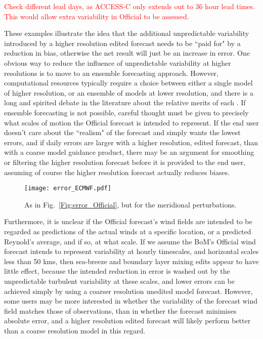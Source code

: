 \documentclass{article}
\begin{document}
\textcolor{red}{Check different lead days, as ACCESS-C only extends out to 36 hour lead times. This would allow extra variability in Official to be assessed.}

These examples illustrate the idea that the additional unpredictable variability introduced by a higher resolution edited forecast needs to be ``paid for" by a reduction in bias, otherwise the net result will just be an increase in error.  One obvious way to reduce the influence of unpredictable variability at higher resolutions is to move to an ensemble forecasting approach. However, computational resources typically require a choice between either a single model of higher resolution, or an ensemble of models at lower resolution, and there is a long and spirited debate in the literature about the relative merits of each \citep{brooks93}. If ensemble forecasting is not possible, careful thought must be given to precisely what scales of motion the Official forecast is intended to represent. If the end user doesn't care about the ``realism" of the forecast and simply wants the lowest errors, and if daily errors are larger with a higher resolution, edited forecast, than with a coarse model guidance product, there may be an argument for smoothing or filtering the higher resolution forecast before it is provided to the end user, assuming of course the higher resolution forecast actually reduces biases. 

\begin{figure*}
\centering
\texttt{[image: error\_ECMWF.pdf]}
\caption{As in Fig.~\ref{Fig:error_Official}, but for the meridional perturbations.}
\label{Fig:error_ECMWF}
\end{figure*}

Furthermore, it is unclear if the Official forecast's wind fields are intended to be regarded as predictions of the actual winds at a specific location, or a predicted Reynold's average, and if so, at what scale. If we assume the BoM's Official wind forecast intends to represent variability at hourly timescales, and horizontal scales less than 50 kms, then sea-breeze and boundary layer mixing edits appear to have little effect, because the intended reduction in error is washed out by the unpredictable turbulent variability at these scales, and lower errors can be achieved simply by using a coarser resolution unedited model forecast. However, some users may be more interested in whether the variability of the forecast wind field matches those of observations, than in whether the forecast minimises absolute error, and a higher resolution edited forecast will likely perform better than a coarse resolution model in this regard. 
\end{document}
